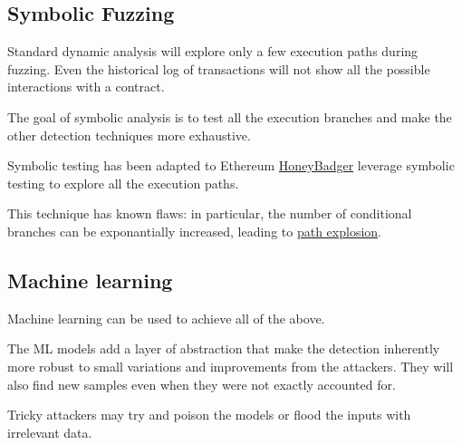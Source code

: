 \subsection{Symbolic Fuzzing}

Standard dynamic analysis will explore only a few execution paths during fuzzing.
Even the historical log of transactions will not show all the possible interactions with a contract.

The goal of symbolic analysis is to test all the execution branches and make the other detection techniques more exhaustive.

Symbolic testing has been adapted to Ethereum  \href{\urlcodehoneybadger}{HoneyBadger} leverage symbolic testing to explore all the execution paths.

This technique has known flaws: in particular, the number of conditional branches can be exponantially increased, leading to \href{\urlarticlepathexplosion}{path explosion}.

\subsection{Machine learning}

Machine learning can be used to achieve all of the above.

The ML models add a layer of abstraction that make the detection inherently more robust to small variations and improvements from the attackers.
They will also find new samples even when they were not exactly accounted for.

Tricky attackers may try and poison the models or flood the inputs with irrelevant data.

